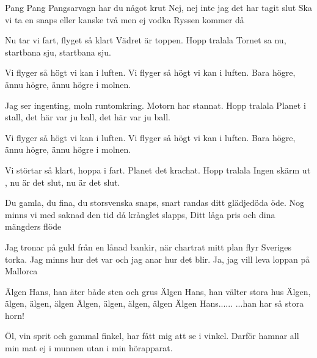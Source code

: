 
\songtext{}Pang Pang Pangsarvagn
har du något krut
Nej, nej inte jag
det har tagit slut
Ska vi ta en snaps 
eller kanske två
men ej vodka 
Ryssen kommer då


\songtext{}Nu tar vi fart, flyget så klart
Vädret är toppen.
Hopp tralala
Tornet sa nu, startbana sju, startbana sju.

Vi flyger så högt vi kan i luften.
Vi flyger så högt vi kan i luften.
Bara högre, ännu högre, ännu högre i molnen.

Jag ser ingenting, moln runtomkring.
Motorn har stannat.
Hopp tralala
Planet i stall, det här var ju ball, det här var ju ball.

Vi flyger så högt vi kan i luften.
Vi flyger så högt vi kan i luften.
Bara högre, ännu högre, ännu högre i molnen.

Vi störtar så klart, hoppa i fart.
Planet det krachat.
Hopp tralala
Ingen skärm ut , nu är det slut, nu är det slut.


\songtext{}Du gamla, du fina, du storsvenska snaps,
snart randas ditt glädjedöda öde.
Nog minns vi med saknad den tid då krånglet slapps,
\leftrepeat Ditt låga pris och dina mängders flöde \rightrepeat

Jag tronar på guld från en lånad bankir,
när chartrat mitt plan flyr Sveriges torka.
Jag minns hur det var och jag anar hur det blir.
\leftrepeat Ja, jag vill leva loppan på Mallorca \rightrepeat


\songtext{} Älgen Hans, han äter både sten och grus
Älgen Hans, han välter stora hus
Älgen, älgen, älgen, älgen
Älgen, älgen, älgen, älgen
Älgen Hans......
...han har så stora horn!


\songtext{} Öl, vin sprit och gammal finkel,
har fått mig att se i vinkel.
Darför hamnar all min mat 
ej i munnen utan i min
hörapparat.

